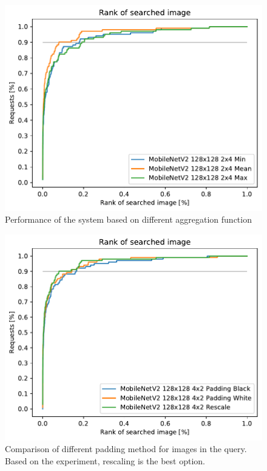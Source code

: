 \begin{figure}
\centering
\includegraphics[width=0.8\linewidth]{graphs/70c56dc52be92e048f57b9bdfb35ddce2be41fd2454ae360588da2e387b09de5.pdf}
\caption{Performance of the system based on different aggregation function}
\label{fig:ranking_funcs}
\end{figure}

\begin{figure}
    \centering
    \includegraphics[width=0.8\linewidth]{graphs/bf57efafbbbc7b5a1744054d87d4ecfa381c9eaf2459186904190d97bcb99a81.pdf}
    \caption{Comparison of different padding method for images in the query. Based on the experiment, rescaling is the best option.}
    \label{fig:padding}
\end{figure}

